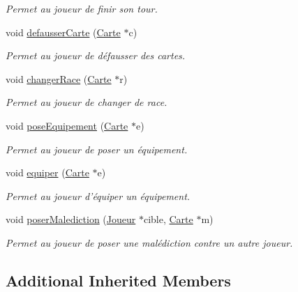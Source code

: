 \begin{DoxyCompactItemize}
\begin{DoxyCompactList}\small\item\em Permet au joueur de finir son tour. \end{DoxyCompactList}\item 
void \hyperlink{class_fin_tour_abb40077b94a4b3e345b41299deb6266b}{defausser\-Carte} (\hyperlink{class_carte}{Carte} $\ast$c)
\begin{DoxyCompactList}\small\item\em Permet au joueur de défausser des cartes. \end{DoxyCompactList}\item 
void \hyperlink{class_fin_tour_a6b217f7a319c9daba98722b86b30da66}{changer\-Race} (\hyperlink{class_carte}{Carte} $\ast$r)
\begin{DoxyCompactList}\small\item\em Permet au joueur de changer de race. \end{DoxyCompactList}\item 
void \hyperlink{class_fin_tour_a14304d88c8b344c35cd44fe609c499b6}{pose\-Equipement} (\hyperlink{class_carte}{Carte} $\ast$e)
\begin{DoxyCompactList}\small\item\em Permet au joueur de poser un équipement. \end{DoxyCompactList}\item 
void \hyperlink{class_fin_tour_a08a9ac7c490c13d6f4b116a55abdad86}{equiper} (\hyperlink{class_carte}{Carte} $\ast$e)
\begin{DoxyCompactList}\small\item\em Permet au joueur d'équiper un équipement. \end{DoxyCompactList}\item 
void \hyperlink{class_fin_tour_a526c160be39842a8d61c753ee5f3e6bf}{poser\-Malediction} (\hyperlink{class_joueur}{Joueur} $\ast$cible, \hyperlink{class_carte}{Carte} $\ast$m)
\begin{DoxyCompactList}\small\item\em Permet au joueur de poser une malédiction contre un autre joueur. \end{DoxyCompactList}\end{DoxyCompactItemize}
\subsection*{Additional Inherited Members}


